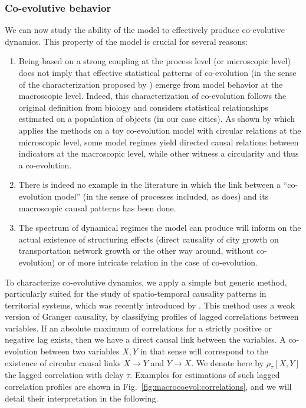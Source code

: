 \documentclass[11pt]{article}
\begin{document}
\subsubsection{Co-evolutive behavior}



We can now study the ability of the model to effectively produce co-evolutive dynamics. This property of the model is crucial for several reasons:

\begin{enumerate}
\item Being based on a strong coupling at the process level (or microscopic level) does not imply that effective statistical patterns of co-evolution (in the sense of the characterization proposed by \cite{raimbault2018caracterisation}) emerge from model behavior at the macroscopic level. Indeed, this characterization of co-evolution follows the original definition from biology and considers statistical relationships estimated on a population of objects (in our case cities). As shown by \cite{raimbault2017identification} which applies the methods on a toy co-evolution model with circular relations at the microscopic level, some model regimes yield directed causal relations between indicators at the macroscopic level, while other witness a circularity and thus a co-evolution.
\item There is indeed no example in the literature in which the link between a ``co-evolution model'' (in the sense of processes included, as \cite{schmitt2014modelisation} does) and its macroscopic causal patterns has been done.
\item The spectrum of dynamical regimes the model can produce will inform on the actual existence of structuring effects (direct causality of city growth on transportation network growth or the other way around, without co-evolution) or of more intricate relation in the case of co-evolution.
\end{enumerate}


To characterize co-evolutive dynamics, we apply a simple but generic method, particularly suited for the study of spatio-temporal causality patterns in territorial systems, which was recently introduced by \cite{raimbault2017identification}. This method uses a weak version of Granger causality, by classifying profiles of lagged correlations between variables. If an absolute maximum of correlations for a strictly positive or negative lag exists, then we have a direct causal link between the variables. A co-evolution between two variables $X,Y$ in that sense will correspond to the existence of circular causal links $X\rightarrow Y$ and $Y\rightarrow X$. We denote here by $\rho_{\tau}\left[X,Y\right]$ the lagged correlation with delay $\tau$. Examples for estimations of such lagged correlation profiles are shown in Fig.~\ref{fig:macrocoevol:correlations}, and we will detail their interpretation in the following.
\end{document}
